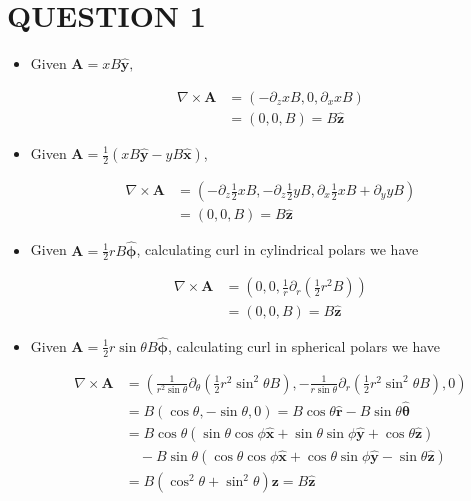 \documentclass[a4paper]{article}
\begin{document}
	
\maketitle

\section{QUESTION 1}


\begin{itemize}
	\item Given $ \mathbf{A} = x B \hat{\mathbf{y}},   $
	
	\begin{align*}
	\nabla \times \mathbf{A} & =  ( - \partial_{z} x B, 0, \partial_{x} x B   )  \\
	& = (0,0,B) = B \hat{\mathbf{z}}
	\end{align*}
	
	\item Given $ \mathbf{A} =   \frac{1}{2} ( x B \hat{\mathbf{y}} -  y B \hat{\mathbf{x}} ) $,
	
	\begin{align*}
	\nabla \times \mathbf{A} & =  ( - \partial_{z} \frac{1}{2} x B, - \partial_{z} \frac{1}{2} y B, \partial_{x} \frac{1}{2} x B + \partial_{y} y B   )  \\
	& = (0,0,B) = B \hat{\mathbf{z}}
	\end{align*}
	
	\item Given $ \mathbf{A} =   \frac{1}{2} r B \hat{\mathbf{\phi}} $, calculating curl in cylindrical polars we have 
	
	\begin{align*}
	\nabla \times \mathbf{A} & =  \left( 0, 0, \frac{1}{r} \partial_{r} \left( \frac{1}{2} r^{2} B \right)    \right)  \\
	& = (0,0,B) = B \hat{\mathbf{z}}
	\end{align*}
	
	\item Given $ \mathbf{A} =   \frac{1}{2} r \sin \theta B \hat{\mathbf{\phi}} $, calculating curl in spherical polars we have 
	
	\begin{align*}
	\nabla \times \mathbf{A} & = \left(   \frac{1}{r^{2}\sin \theta} \partial_{\theta} \left(  \frac{1}{2} r^{2} \sin^{2} \theta B   \right),  - \frac{1}{r \sin \theta} \partial_{r}  \left( \frac{1}{2} r^{2} \sin^{2} \theta  B \right), 0       \right)      \\
	& = B (\cos \theta, - \sin \theta, 0 )  =  B \cos \theta \hat{\mathbf{r}} - B \sin \theta \hat{\boldsymbol\theta}   \\
	& =  B \cos \theta \left(  \sin \theta \cos \phi \hat{\mathbf{x}} + \sin \theta \sin \phi \hat{\mathbf{y}} + \cos \theta \hat{\mathbf{z}} \right) \\
	& \quad - B \sin \theta \left(  \cos \theta \cos \phi \hat{\mathbf{x}} + \cos \theta \sin \phi  \hat{\mathbf{y}} - \sin \theta \hat{\mathbf{z}}  \right)      \\
	& = B(\cos^{2} \theta + \sin^{2} \theta ) \mathbf{z}   =  B \hat{\mathbf{z}}
	\end{align*}
	


\end{itemize}
\end{document}
